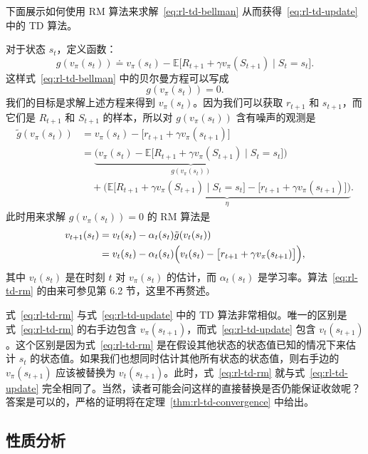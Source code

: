 \begin{derivation}[方框 7.1：推导时序差分算法]
\label{box:rl-td-derive}
下面展示如何使用 RM 算法来求解~\eqref{eq:rl-td-bellman} 从而获得~\eqref{eq:rl-td-update} 中的 TD 算法。

对于状态 $s_t$，定义函数：
\[
  g(v_{\pi}(s_t)) \doteq v_{\pi}(s_t) - \mathbb{E}\big[ R_{t+1} + \gamma v_{\pi}(S_{t+1}) \mid S_t = s_t \big].
\]
这样式~\eqref{eq:rl-td-bellman} 中的贝尔曼方程可以写成
\[
  g(v_{\pi}(s_t)) = 0.
\]
我们的目标是求解上述方程来得到 $v_{\pi}(s_t)$。因为我们可以获取 $r_{t+1}$ 和 $s_{t+1}$，而它们是 $R_{t+1}$ 和 $S_{t+1}$ 的样本，所以对 $g(v_{\pi}(s_t))$ 含有噪声的观测是
\begin{align*}
  \tilde{g}(v_{\pi}(s_t)) &= v_{\pi}(s_t) - \big[ r_{t+1} + \gamma v_{\pi}(s_{t+1}) \big] \\
  &= \underbrace{\Big( v_{\pi}(s_t) - \mathbb{E}\big[ R_{t+1} + \gamma v_{\pi}(S_{t+1}) \mid S_t = s_t \big] \Big)}_{g(v_{\pi}(s_t))} \\
  &\quad + \underbrace{\Big( \mathbb{E}\big[ R_{t+1} + \gamma v_{\pi}(S_{t+1}) \mid S_t = s_t \big] - \big[ r_{t+1} + \gamma v_{\pi}(s_{t+1}) \big] \Big)}_{\eta}.
\end{align*}
此时用来求解 $g(v_{\pi}(s_t)) = 0$ 的 RM 算法是
\begin{align}
  v_{t+1}(s_t) &= v_t(s_t) - \alpha_t(s_t) \tilde{g}(v_t(s_t)) \notag \\
  &= v_t(s_t) - \alpha_t(s_t) \Big( v_t(s_t) - \big[ r_{t+1} + \gamma v_{\pi}(s_{t+1}) \big] \Big),
  \label{eq:rl-td-rm}
\end{align}
其中 $v_t(s_t)$ 是在时刻 $t$ 对 $v_{\pi}(s_t)$ 的估计，而 $\alpha_t(s_t)$ 是学习率。算法~\eqref{eq:rl-td-rm} 的由来可参见第 6.2 节，这里不再赘述。

式~\eqref{eq:rl-td-rm} 与式~\eqref{eq:rl-td-update} 中的 TD 算法非常相似。唯一的区别是式~\eqref{eq:rl-td-rm} 的右手边包含 $v_{\pi}(s_{t+1})$，而式~\eqref{eq:rl-td-update} 包含 $v_t(s_{t+1})$。这个区别是因为式~\eqref{eq:rl-td-rm} 是在假设其他状态的状态值已知的情况下来估计 $s_t$ 的状态值。如果我们也想同时估计其他所有状态的状态值，则右手边的 $v_{\pi}(s_{t+1})$ 应该被替换为 $v_t(s_{t+1})$。此时，式~\eqref{eq:rl-td-rm} 就与式~\eqref{eq:rl-td-update} 完全相同了。当然，读者可能会问这样的直接替换是否仍能保证收敛呢？答案是可以的，严格的证明将在定理~\ref{thm:rl-td-convergence} 中给出。
\end{derivation}

\subsection{性质分析}
\label{sec:rl-td-sv-property}

